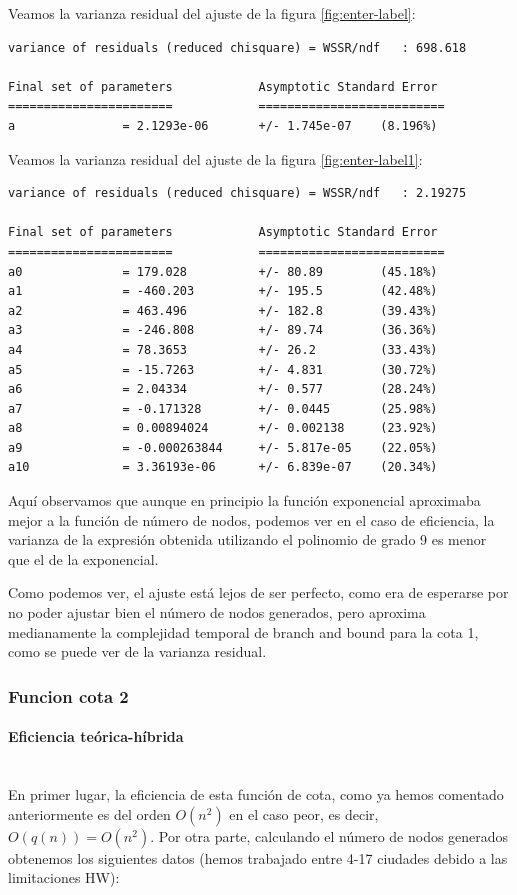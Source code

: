 \documentclass{article}
\newcommand{\myparagraph}[1]{\paragraph{#1}\mbox{}\\}
\begin{document}
Veamos la varianza residual del ajuste de la figura \ref{fig:enter-label}:
\begin{lstlisting}[numbers=none]
variance of residuals (reduced chisquare) = WSSR/ndf   : 698.618

Final set of parameters            Asymptotic Standard Error
=======================            ==========================
a               = 2.1293e-06       +/- 1.745e-07    (8.196%)
\end{lstlisting}

Veamos la varianza residual del ajuste de la figura \ref{fig:enter-label1}:
\begin{lstlisting}[numbers=none]
variance of residuals (reduced chisquare) = WSSR/ndf   : 2.19275

Final set of parameters            Asymptotic Standard Error
=======================            ==========================
a0              = 179.028          +/- 80.89        (45.18%)
a1              = -460.203         +/- 195.5        (42.48%)
a2              = 463.496          +/- 182.8        (39.43%)
a3              = -246.808         +/- 89.74        (36.36%)
a4              = 78.3653          +/- 26.2         (33.43%)
a5              = -15.7263         +/- 4.831        (30.72%)
a6              = 2.04334          +/- 0.577        (28.24%)
a7              = -0.171328        +/- 0.0445       (25.98%)
a8              = 0.00894024       +/- 0.002138     (23.92%)
a9              = -0.000263844     +/- 5.817e-05    (22.05%)
a10             = 3.36193e-06      +/- 6.839e-07    (20.34%)
\end{lstlisting}

Aquí observamos que aunque en principio la función exponencial aproximaba mejor a la función de número de nodos, podemos ver en el caso de eficiencia, la varianza de la expresión obtenida utilizando el polinomio de grado 9 es menor que el de la exponencial.

Como podemos ver, el ajuste está lejos de ser perfecto, como era de esperarse por no poder ajustar bien el número de nodos generados, pero aproxima medianamente la complejidad temporal de branch and bound para la cota 1, como se puede ver de la varianza residual.

\subsubsection{Funcion cota 2}

\myparagraph{Eficiencia teórica-híbrida}
En primer lugar, la eficiencia de esta función de cota, como ya hemos comentado anteriormente es del orden $O(n^2)$ en el caso peor, es decir, 
$O(q(n)) = O(n^2)$. Por otra parte, calculando el número de nodos generados obtenemos los siguientes datos (hemos trabajado entre 4-17 ciudades debido a las limitaciones HW): 
\end{document}
